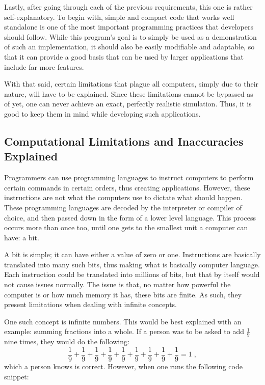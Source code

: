 Lastly, after going through each of the previous requirements, this one is rather self-explanatory. To begin with, simple and compact code that works well standalone is one of the most important programming practices that developers should follow. While this program's goal is to simply be used as a demonstration of such an implementation, it should also be easily modifiable and adaptable, so that it can provide a good basis that can be used by larger applications that include far more features.

With that said, certain limitations that plague all computers, simply due to their nature, will have to be explained. Since these limitations cannot be bypassed as of yet, one can never achieve an exact, perfectly realistic simulation. Thus, it is good to keep them in mind while developing such applications.

\subsection{Computational Limitations and Inaccuracies Explained}

Programmers can use programming languages to instruct computers to perform certain commands in certain orders, thus creating applications. However, these instructions are not what the computers use to dictate what should happen. These programming languages are decoded by the interpreter or compiler of choice, and then passed down in the form of a lower level language. This process occurs more than once too, until one gets to the smallest unit a computer can have: a bit.

A bit is simple; it can have either a value of zero or one. Instructions are basically translated into many such bits, thus making what is basically computer language. Each instruction could be translated into millions of bits, but that by itself would not cause issues normally. The issue is that, no matter how powerful the computer is or how much memory it has, these bits are finite. As such, they present limitations when dealing with infinite concepts.

One such concept is infinite numbers. This would be best explained with an example: summing fractions into a whole. If a person was to be asked to add $\frac{1}{9}$ nine times, they would do the following:
$$\frac{1}{9} + \frac{1}{9} + \frac{1}{9} + \frac{1}{9} + \frac{1}{9} + \frac{1}{9} + \frac{1}{9} + \frac{1}{9} + \frac{1}{9} = 1 \;,$$ which a person knows is correct. However, when one runs the following code snippet:

